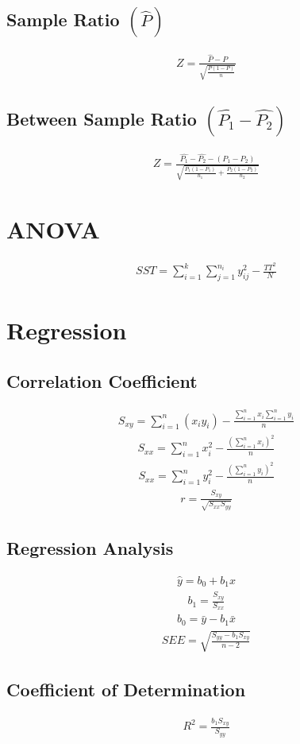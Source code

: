 \documentclass[twocolumn]{article}
\begin{document}
\subsection{Sample Ratio $(\hat{P})$}
\begin{align*}
    Z = \frac{\hat{P} - P}{\sqrt{\frac{P(1-P)}{n}}}
\end{align*}
\subsection{Between Sample Ratio $(\hat{P_{1}} - \hat{P_{2}})$}
\begin{align*}
    Z = \frac{\hat{P_{1}} - \hat{P_{2}} - (P_{1} - P_{2})}{\sqrt{\frac{P_{1}(1-P_{1})}{n_{1}} + \frac{P_{2}(1-P_{2})}{n_{2}}}}
\end{align*}
\section{ANOVA}
\begin{align*}
    SST = \sum_{i=1}^{k}\sum_{j=1}^{n_{i}}y_{ij}^{2} - \frac{TT^2}{N}
\end{align*}
\section{Regression}
\subsection{Correlation Coefficient}
\begin{align*}
    S_{xy} = \sum_{i=1}^{n}(x_{i}y_{i}) - \frac{\sum_{i=1}^{n}x_{i}\sum_{i=1}^{n}y_{i}}{n}
\end{align*}
\begin{align*}
    S_{xx} = \sum_{i=1}^{n}x_{i}^{2} - \frac{(\sum_{i=1}^{n}x_{i})^{2}}{n}
\end{align*}
\begin{align*}
    S_{xx} = \sum_{i=1}^{n}y_{i}^{2} - \frac{(\sum_{i=1}^{n}y_{i})^{2}}{n}
\end{align*}
\begin{align*}
    r = \frac{S_{xy}}{\sqrt{S_{xx}S_{yy}}}
\end{align*}
\subsection{Regression Analysis}
\begin{align*}
    \hat{y} = b_{0} + b_{1}x
\end{align*}
\begin{align*}
    b_{1} = \frac{S_{xy}}{S_{xx}}
\end{align*}
\begin{align*}
    b_{0} = \bar{y} - b_{1}\bar{x}
\end{align*}
\begin{align*}
    SEE = \sqrt{\frac{S_{yy} - b_{1} S_{xy}}{n-2}}
\end{align*}
\subsection{Coefficient of Determination}
\begin{align*}
    R^{2} = \frac{b_{1}S_{xy}}{S_{yy}}
\end{align*}
\end{document}
